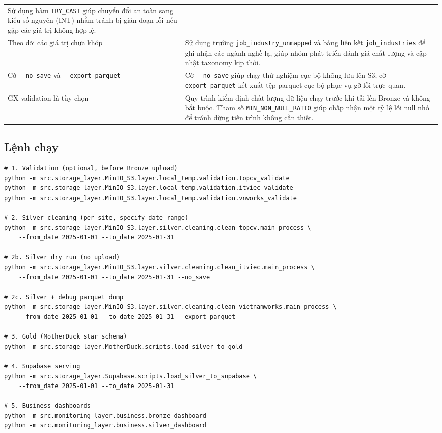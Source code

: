 \begin{longtable}{p{} p{}}
Sử dụng hàm \texttt{TRY\_CAST} giúp chuyển đổi an toàn sang kiểu số nguyên (INT) nhằm tránh bị gián đoạn lỗi nếu gặp các giá trị không hợp lệ. \\
Theo dõi các giá trị chưa khớp & Sử dụng trường \texttt{job\_industry\_unmapped} và bảng liên kết
\texttt{job\_industries} để ghi nhận các ngành nghề lạ, giúp nhóm phát triển đánh giá chất lượng và cập nhật taxonomy kịp thời. \\
Cờ \texttt{-{}-no\_save} và \texttt{-{}-export\_parquet} & Cờ \texttt{-{}-no\_save} giúp
chạy thử nghiệm cục bộ không lưu lên S3; cờ \texttt{-{}-export\_parquet} kết xuất tệp parquet cục bộ phục vụ gỡ lỗi trực quan. \\
GX validation là tùy chọn & Quy trình kiểm định chất lượng dữ liệu chạy trước khi tải lên Bronze và không bắt buộc.
Tham số \texttt{MIN\_NON\_NULL\_RATIO} giúp chấp nhận một tỷ lệ lỗi null nhỏ để tránh dừng tiến trình không cần thiết. \\
\bottomrule
\end{longtable}

\subsection{Lệnh chạy}
\label{subsec:processing-commands}

\begin{lstlisting}[style=pystyle, caption={Các lệnh chạy và vận hành Processing Layer}, label={lst:processing-commands}]
# 1. Validation (optional, before Bronze upload)
python -m src.storage_layer.MinIO_S3.layer.local_temp.validation.topcv_validate
python -m src.storage_layer.MinIO_S3.layer.local_temp.validation.itviec_validate
python -m src.storage_layer.MinIO_S3.layer.local_temp.validation.vnworks_validate

# 2. Silver cleaning (per site, specify date range)
python -m src.storage_layer.MinIO_S3.layer.silver.cleaning.clean_topcv.main_process \
    --from_date 2025-01-01 --to_date 2025-01-31

# 2b. Silver dry run (no upload)
python -m src.storage_layer.MinIO_S3.layer.silver.cleaning.clean_itviec.main_process \
    --from_date 2025-01-01 --to_date 2025-01-31 --no_save

# 2c. Silver + debug parquet dump
python -m src.storage_layer.MinIO_S3.layer.silver.cleaning.clean_vietnamworks.main_process \
    --from_date 2025-01-01 --to_date 2025-01-31 --export_parquet

# 3. Gold (MotherDuck star schema)
python -m src.storage_layer.MotherDuck.scripts.load_silver_to_gold

# 4. Supabase serving
python -m src.storage_layer.Supabase.scripts.load_silver_to_supabase \
    --from_date 2025-01-01 --to_date 2025-01-31

# 5. Business dashboards
python -m src.monitoring_layer.business.bronze_dashboard
python -m src.monitoring_layer.business.silver_dashboard
\end{lstlisting}

